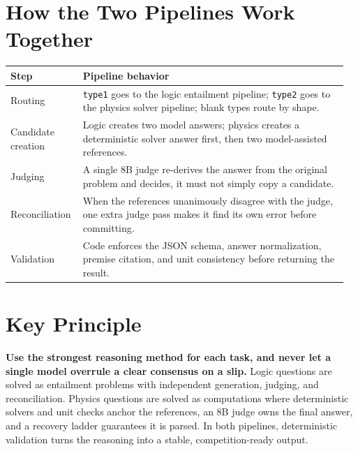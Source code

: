 \documentclass[10pt]{article}
\begin{document}
\section*{How the Two Pipelines Work Together}
\begin{tabular}{@{}p{0.20\linewidth}p{0.76\linewidth}@{}}
\toprule
\textbf{Step} & \textbf{Pipeline behavior} \\
\midrule
Routing & \texttt{type1} goes to the logic entailment pipeline; \texttt{type2}
goes to the physics solver pipeline; blank types route by shape. \\
Candidate creation & Logic creates two model answers; physics creates a
deterministic solver answer first, then two model-assisted references. \\
Judging & A single 8B judge re-derives the answer from the original problem and
decides, it must not simply copy a candidate. \\
Reconciliation & When the references unanimously disagree with the judge, one
extra judge pass makes it find its own error before committing. \\
Validation & Code enforces the JSON schema, answer normalization, premise
citation, and unit consistency before returning the result. \\
\bottomrule
\end{tabular}

\section*{Key Principle}
\textbf{Use the strongest reasoning method for each task, and never let a single
model overrule a clear consensus on a slip.} Logic questions are solved as
entailment problems with independent generation, judging, and reconciliation.
Physics questions are solved as computations where deterministic solvers and unit
checks anchor the references, an 8B judge owns the final answer, and a recovery
ladder guarantees it is parsed. In both pipelines, deterministic validation turns
the reasoning into a stable, competition-ready output.
\end{document}
